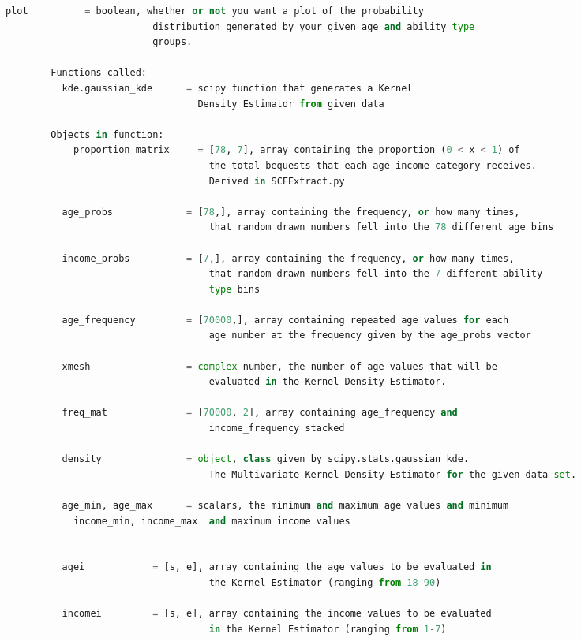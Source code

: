 \documentclass[letterpaper,12pt]{article}
\theoremstyle{definition}
\begin{document}
\begin{spacing}{1.5}
\begin{lstlisting}[language=Python, caption=MVKDE.py]
            plot          = boolean, whether or not you want a plot of the probability
                          distribution generated by your given age and ability type
                          groups.

        Functions called:
          kde.gaussian_kde      = scipy function that generates a Kernel
                                  Density Estimator from given data

        Objects in function:
            proportion_matrix     = [78, 7], array containing the proportion (0 < x < 1) of
                                    the total bequests that each age-income category receives.
                                    Derived in SCFExtract.py

          age_probs             = [78,], array containing the frequency, or how many times,
                                    that random drawn numbers fell into the 78 different age bins

          income_probs          = [7,], array containing the frequency, or how many times,
                                    that random drawn numbers fell into the 7 different ability
                                    type bins

          age_frequency         = [70000,], array containing repeated age values for each
                                    age number at the frequency given by the age_probs vector

          xmesh                 = complex number, the number of age values that will be
                                    evaluated in the Kernel Density Estimator.

          freq_mat              = [70000, 2], array containing age_frequency and
                                    income_frequency stacked

          density               = object, class given by scipy.stats.gaussian_kde.
                                    The Multivariate Kernel Density Estimator for the given data set.

          age_min, age_max      = scalars, the minimum and maximum age values and minimum
            income_min, income_max  and maximum income values


          agei            = [s, e], array containing the age values to be evaluated in
                                    the Kernel Estimator (ranging from 18-90)

          incomei         = [s, e], array containing the income values to be evaluated
                                    in the Kernel Estimator (ranging from 1-7)


\end{lstlisting}
\end{spacing}
\end{document}
